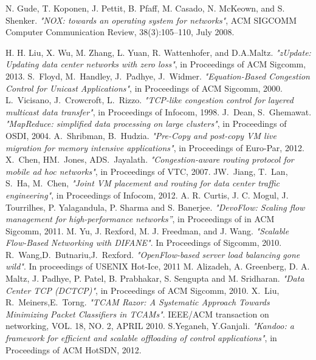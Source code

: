 \documentclass[conference]{IEEEtran}
\begin{document}
\begin{thebibliography}{1}

N. Gude, T. Koponen, J. Pettit, B. Pfaff, M. Casado, N. McKeown, and
S. Shenker. \emph{"NOX: towards an operating system for networks"}, ACM
SIGCOMM Computer Communication Review, 38(3):105–110, July 2008.

H. H. Liu, X. Wu, M. Zhang, L. Yuan, R. Wattenhofer, and D.A.Maltz. \emph{"zUpdate: Updating data center networks with zero loss"}, in Proceedings of ACM Sigcomm, 2013.
S.~Floyd, M.~Handley, J.~Padhye, J.~Widmer. \emph{"Equation-Based Congestion Control for Unicast Applications"}, in Proceedings of ACM Sigcomm, 2000.
L.~Vicisano, J.~Crowcroft, L.~Rizzo. \emph{"TCP-like congestion control for layered multicast data transfer"}, in Proceedings of Infocom, 1998.
J.~Dean, S.~Ghemawat. \emph{"MapReduce: simplified data processing on large clusters"}, in Proceedings of OSDI, 2004.
A.~Shribman, B.~Hudzia. \emph{"Pre-Copy and post-copy VM live migration for memory intensive applications"}, in Proceedings of Euro-Par, 2012.
X.~Chen, HM.~Jones, ADS.~Jayalath. \emph{"Congestion-aware routing protocol for mobile ad hoc networks"}, in Proceedings of VTC, 2007.
JW.~Jiang, T.~Lan, S.~Ha, M.~Chen, \emph{"Joint VM placement and routing for data center traffic engineering"}, in Proceedings of Infocom, 2012.
A. R. Curtis, J. C. Mogul, J. Tourrilhes, P. Yalagandula, P. Sharma and S. Banerjee. \emph{"DevoFlow: Scaling flow management for high-performance networks”}, in Proceedings of in ACM Sigcomm, 2011.
M. Yu, J. Rexford, M. J. Freedman, and J. Wang. \emph{"Scalable Flow-Based Networking with DIFANE"}. In Proceedings of Sigcomm, 2010.
R.~Wang,D.~Butnariu,J.~Rexford. \emph{"OpenFlow-based server load balancing gone wild"}. In proceedings of USENIX Hot-Ice, 2011
M. Alizadeh, A. Greenberg, D. A. Maltz, J. Padhye, P. Patel, B. Prabhakar, S. Sengupta and M. Sridharan. \emph{"Data Center TCP (DCTCP)"}, in Proceedings of ACM Sigcomm, 2010.
X.~Liu, R.~Meiners,E.~Torng. \emph{"TCAM Razor: A Systematic Approach Towards Minimizing Packet Classifiers in TCAMs"}. IEEE/ACM transaction on networking, VOL. 18, NO. 2, APRIL 2010.
S.Yeganeh, Y.Ganjali. \emph{"Kandoo: a framework for efficient and scalable offloading of control applications"}, in Proceedings of ACM HotSDN, 2012.

\end{thebibliography}
\end{document}
